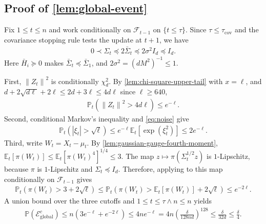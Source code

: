 \documentclass[12pt,cleveref]{jmlr}
\renewenvironment{proof}[1][\proofname]
{\par\noindent{\bfseries\upshape #1\ }}
{\jmlrQED}
\newcommand{\E}{\mathbb E}
\newcommand{\Pp}{\mathbb P}
\newcommand{\F}{\mathcal F}
\newcommand{\1}{\mathbf 1}
\newcommand{\norm}[1]{\left\lVert #1\right\rVert}
\newcommand{\alireza}[1]{\todo[color=blue!20,size=\tiny]{Alireza: #1}}
\begin{document}
\subsection{Proof of \cref{lem:global-event}}
\label{app:global-event}
\begin{proof}
    Fix $1\leq t\leq n$ and work conditionally on $\F_{t-1}$ on
    $\{t\leq\tau\}$. Since $\tau\leq\tau_{\mathrm{cov}}$ and
    the covariance stopping rule tests the update at $t+1$, we have\alireza{checked.}
    \begin{align}
        0\prec\Sigma_t\preceq2\bar\Sigma_t
        \preceq2\sigma^2I_d\preceq I_d.
    \end{align}
    Here $\bar H_i\succeq0$ makes $\bar\Sigma_t\preceq\bar\Sigma_1$,
    and $2\sigma^2=(dM^2)^{-1}\leq1$.

    First, $\norm{Z_t}^2$ is conditionally $\chi_d^2$.
    By \cref{lem:chi-square-upper-tail} with $x=\ell$, and
    $d+2\sqrt{d\ell}+2\ell\leq2d+3\ell\leq4d\ell$ since $\ell\geq640$,
    \begin{align}
        \Pp_t\left(\norm{Z_t}^2>4d\ell\right)\leq e^{-\ell}.
    \end{align}
    Second, conditional Markov's inequality and \cref{eq:noise} give
    \begin{align}
        \Pp_t\left(|\xi_t|>\sqrt\ell\right)
        \leq e^{-\ell}\E_t[\exp(\xi_t^2)]\leq2e^{-\ell}.
    \end{align}
    Third, write $W_t=X_t-\mu_t$. By
    \cref{lem:gaussian-gauge-fourth-moment},
    $\E_t[\pi(W_t)]\leq\E_t[\pi(W_t)^4]^{1/4}\leq3$.
    The map $z\mapsto\pi(\Sigma_t^{1/2}z)$ is $1$-Lipschitz,
    because $\pi$ is $1$-Lipschitz and $\Sigma_t\preceq I_d$.
    Therefore, applying \citet[Theorem~5.6]{boucheron2013concentration} to this map
    conditionally on $\F_{t-1}$ gives
    \begin{align}
        \Pp_t\left(\pi(W_t)>3+2\sqrt\ell\right)
        \leq
        \Pp_t\left(\pi(W_t)>\E_t[\pi(W_t)]+2\sqrt\ell\right)
        \leq e^{-2\ell}.
    \end{align}
    A union bound over the three cutoffs and $1\leq t\leq \tau \wedge n \leq n$ yields
    \begin{align}
        \Pp(\mathcal E_{\mathrm{global}}^c)
        \leq n\left(3e^{-\ell}+e^{-2\ell}\right)
        \leq4ne^{-\ell}
        =4n\left(\frac{\delta}{128nd}\right)^{128}
        \leq\frac{\delta}{32d}\leq\frac\delta4.
    \end{align}
\end{proof}
\end{document}
